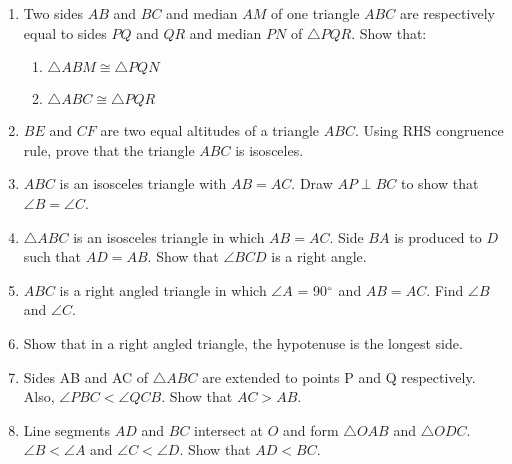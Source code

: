 \begin{enumerate}[label=\arabic*.,ref=\thesubsection.\theenumi]
\item  Two sides $AB$ and $BC$ and median $AM$ of one triangle $ABC$ are respectively equal to sides $PQ$ and $QR$ and median $PN$ of $\triangle  PQR$. Show that: 
\begin{enumerate}
\item $\triangle  ABM \cong  \triangle  PQN $
\item $\triangle  ABC \cong  \triangle  PQR$
\end{enumerate}
\item  $BE$ and $CF$ are two equal altitudes of a triangle $ABC$. Using RHS congruence rule, prove that the triangle $ABC$ is isosceles.
\item  $ABC$ is an isosceles triangle with $AB = AC$. Draw $AP \perp BC$ to show that $\angle  B = \angle  C$.
%
\item $\triangle ABC$ is an isosceles triangle in which $AB = AC$. Side $BA$ is produced to $D$ such that $AD = AB$. Show that $\angle BCD$ is a right angle.
%
\item $ABC$ is a right angled triangle in which $\angle A$ = 90$\degree$ and $AB = AC$. Find $\angle B$ and $\angle C$.
%
\item Show that in a right angled triangle, the hypotenuse is the longest side.
\item Sides AB and AC of $\triangle  ABC$ are extended to points P and Q respectively. Also, $\angle  PBC < \angle  QCB$. Show that $AC > AB$.

\item Line segments $AD$ and $BC$ intersect at $O$ and form $\triangle OAB$ and $\triangle ODC$. $\angle  B < \angle  A$ and $\angle  C < \angle  D$. Show that $AD < BC$.


\end{enumerate}
